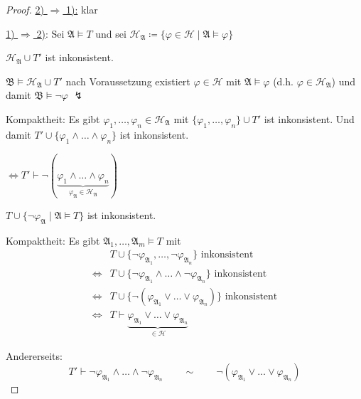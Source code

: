 \documentclass[12pt,parskip=full]{scrartcl}
\newcommand{\heading}{\underline}
\theoremstyle{definition}
\begin{document}
	\begin{proof}
		\heading{2) $\Rightarrow$ 1):} klar
		
		\heading{1) $\Rightarrow$ 2)}: Sei $\mathfrak{A} \models T$ und sei $\mathcal{H}_\mathfrak{A} \coloneqq \{ \varphi \in \mathcal{H} \mid \mathfrak{A} \models \varphi \}$
		
		$\mathcal{H}_\mathfrak{A} \cup T'$ ist inkonsistent.
		
		$\mathfrak{B} \models \mathcal{H}_\mathfrak{A} \cup T'$ nach Voraussetzung existiert $\varphi \in \mathcal{H}$ mit $\mathfrak{A} \models \varphi$ (d.h. $\varphi \in \mathcal{H}_\mathfrak{A}$) und damit $\mathfrak{B} \models \lnot \varphi$ $\lightning$
		
		Kompaktheit: Es gibt $\varphi_1, \dots, \varphi_n \in \mathcal{H}_\mathfrak{A}$ mit $\{ \varphi_1, \dots, \varphi_n \} \cup T'$ ist inkonsistent. Und damit $T' \cup \{ \varphi_1 \land \dots \land \varphi_n \}$ ist inkonsistent.
		
		$\Leftrightarrow T' \vdash \lnot (\underbrace{\varphi_1 \land \dots \land \varphi_n}_{\varphi_\mathfrak{A} \in \mathcal{H}_\mathfrak{A}})$
		
		$T \cup \{ \lnot \varphi_\mathfrak{A} \mid \mathfrak{A} \models T \}$ ist inkonsistent.
		
		Kompaktheit: Es gibt $\mathfrak{A}_1, \dots, \mathfrak{A}_m \models T$ mit \begin{align*}
			&T \cup \{ \lnot \varphi_{\mathfrak{A}_1} , \dots, \lnot \varphi_{\mathfrak{A}_n} \} \text{ inkonsistent} \\
			\Leftrightarrow& T \cup \{ \lnot \varphi_{\mathfrak{A}_1} \land \dots \land \lnot \varphi_{\mathfrak{A}_n} \} \text{ inkonsistent} \\
			\Leftrightarrow& T \cup \{ \lnot (\varphi_{\mathfrak{A}_1} \lor \dots \lor \varphi_{\mathfrak{A}_n}) \} \text{ inkonsistent} \\
			\Leftrightarrow& T \vdash \underbrace{\varphi_{\mathfrak{A}_1} \lor \dots \lor \varphi_{\mathfrak{A}_n}}_{\in \mathcal{H}}
		\end{align*}
		
		Andererseits:
		\begin{equation*}
			T' \vdash \lnot \varphi_{\mathfrak{A}_1} \land \dots \land \lnot \varphi_{\mathfrak{A}_n} \qquad\sim\qquad \lnot(\varphi_{\mathfrak{A}_1} \lor \dots \lor \varphi_{\mathfrak{A}_n})
		\end{equation*}
	\end{proof}
\end{document}
